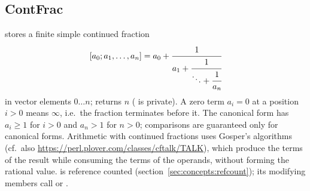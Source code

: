 \subsection{ContFrac}
 stores a finite simple continued fraction
\[
[a_0;a_1,\ldots,a_n]=a_0+\cfrac{1}{a_1+\cfrac{1}{\ddots+\cfrac{1}{a_n}}}
\]
in vector elements $0\ldots n$;  returns $n$ ( is private). A zero term $a_i=0$ at a position $i>0$ means $\infty$, i.e.\ the fraction
terminates before it. The canonical form has $a_i\ge1$ for $i>0$ and $a_n>1$ for $n>0$; comparisons are guaranteed only for canonical forms. Arithmetic with
continued fractions uses Gosper's algorithms \cite{polynomial:hakmem} (cf.\ also \url{https://perl.plover.com/classes/cftalk/TALK}), which produce the terms of the
result while consuming the terms of the operands, without forming the rational value.  is reference counted (section~\ref{sec:concepts:refcount});
its modifying members call  or .
